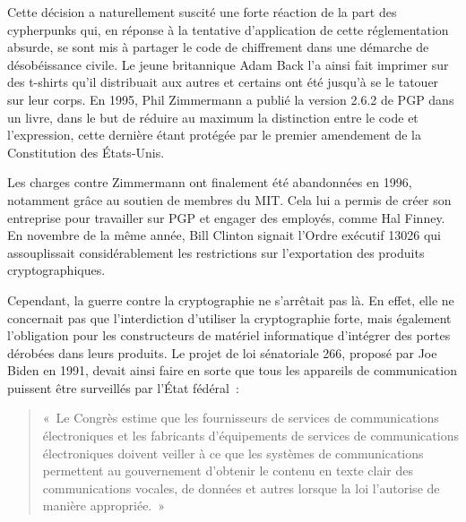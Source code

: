 Cette décision a naturellement suscité une forte réaction de la part des cypherpunks qui, en réponse à la tentative d'application de cette réglementation absurde, se sont mis à partager le code de chiffrement dans une démarche de désobéissance civile. Le jeune britannique Adam Back l'a ainsi fait imprimer sur des t-shirts qu'il distribuait aux autres et certains ont été jusqu'à se le tatouer sur leur corps. En 1995, Phil Zimmermann a publié la version 2.6.2 de PGP dans un livre, dans le but de réduire au maximum la distinction entre le code et l'expression, cette dernière étant protégée par le premier amendement de la Constitution des États-Unis.

Les charges contre Zimmermann ont finalement été abandonnées en 1996, notamment grâce au soutien de membres du MIT. Cela lui a permis de créer son entreprise pour travailler sur PGP et engager des employés, comme Hal Finney. En novembre de la même année, Bill Clinton signait l'Ordre exécutif 13026 qui assouplissait considérablement les restrictions sur l'exportation des produits cryptographiques.


Cependant, la guerre contre la cryptographie ne s'arrêtait pas là. En effet, elle ne concernait pas que l'interdiction d'utiliser la cryptographie forte, mais également l'obligation pour les constructeurs de matériel informatique d'intégrer des portes dérobées dans leurs produits. Le projet de loi sénatoriale 266, proposé par Joe Biden en 1991, devait ainsi faire en sorte que tous les appareils de communication puissent être surveillés par l'État fédéral~: %

\begin{quote}
«~Le Congrès estime que les fournisseurs de services de communications électroniques et les fabricants d'équipements de services de communications électroniques doivent veiller à ce que les systèmes de communications permettent au gouvernement d'obtenir le contenu en texte clair des communications vocales, de données et autres lorsque la loi l'autorise de manière appropriée.~»
\end{quote} %

